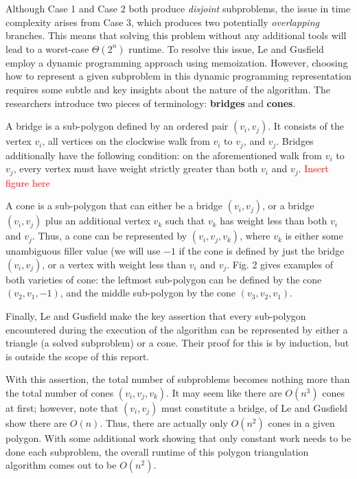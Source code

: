 \documentclass[12pt]{article}
\begin{document}
Although Case 1 and Case 2 both produce \textit{disjoint} subproblems, the issue in time complexity arises from Case 3, which produces two potentially \textit{overlapping} branches. This means that solving this problem without any additional tools will lead to a worst-case $\Theta(2^n)$ runtime. To resolve this issue, Le and Gusfield employ a dynamic programming approach using memoization. However, choosing how to represent a given subproblem in this dynamic programming representation requires some subtle and key insights about the nature of the algorithm. The researchers introduce two pieces of terminology: \textbf{bridges} and \textbf{cones}.

A bridge is a sub-polygon defined by an ordered pair $(v_i, v_j)$. It consists of the vertex $v_i$, all vertices on the clockwise walk from $v_i$ to $v_j$, and $v_j$. Bridges additionally have the following condition: on the aforementioned walk from $v_i$ to $v_j$, every vertex must have weight strictly greater than both $v_i$ and $v_j$. \textcolor{red}{Insert figure here}

A cone is a sub-polygon that can either be a bridge $(v_i, v_j)$, or a bridge $(v_i, v_j)$ plus an additional vertex $v_k$ such that $v_k$ has weight less than both $v_i$ and $v_j$. Thus, a cone can be represented by $(v_i, v_j, v_k)$, where $v_k$ is either some unambiguous filler value (we will use $-1$ if the cone is defined by just the bridge $(v_i, v_j)$, or a vertex with weight less than $v_i$ and $v_j$. Fig. 2 gives examples of both varieties of cone: the leftmost sub-polygon can be defined by the cone $(v_2, v_1, -1)$, and the middle sub-polygon by the cone $(v_3, v_2, v_1)$.

Finally, Le and Gusfield make the key assertion that every sub-polygon encountered during the execution of the algorithm can be represented by either a triangle (a solved subproblem) or a cone. Their proof for this is by induction, but is outside the scope of this report.

With this assertion, the total number of subproblems becomes nothing more than the total number of cones $(v_i, v_j, v_k)$. It may seem like there are $O(n^3)$ cones at first; however, note that $(v_i,v_j)$ must constitute a bridge, of Le and Gusfield show there are $O(n)$. Thus, there are actually only $O(n^2)$ cones in a given polygon. With some additional work showing that only constant work needs to be done each subproblem, the overall runtime of this polygon triangulation algorithm comes out to be $O(n^2)$.
\end{document}
